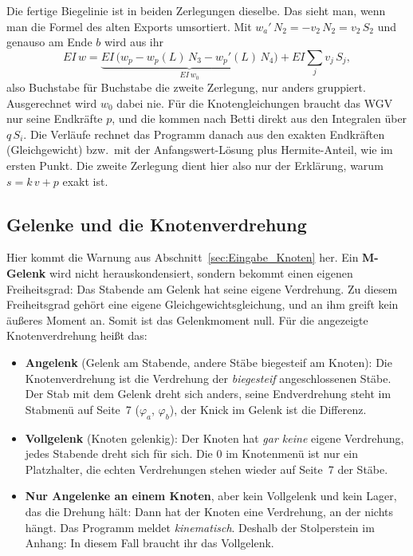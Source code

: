 Die fertige Biegelinie ist in beiden Zerlegungen dieselbe. Das sieht man, wenn man die Formel des
alten Exports umsortiert. Mit $w_a'\,N_2 = -v_2\,N_2 = v_2\,S_2$ und genauso am Ende $b$ wird aus ihr
\[
  EI\,w = \underbrace{EI\,\bigl(w_p - w_p(L)\,N_3 - w_p'(L)\,N_4\bigr)}_{EI\,w_0}
          + EI \sum_j v_j\,S_j ,
\]
also Buchstabe für Buchstabe die zweite Zerlegung, nur anders gruppiert. Ausgerechnet wird $w_0$
dabei nie. Für die Knotengleichungen braucht das WGV nur seine Endkräfte $p$, und die kommen nach
Betti direkt aus den Integralen über $q\,S_i$. Die Verläufe rechnet das Programm danach aus den
exakten Endkräften (Gleichgewicht) bzw.\ mit der Anfangswert-Lösung plus Hermite-Anteil, wie im
ersten Punkt. Die zweite Zerlegung dient hier also nur der Erklärung, warum $s = k\,v + p$ exakt ist.

\subsection{Gelenke und die Knotenverdrehung}\label{sec:mathe-gelenke}

Hier kommt die Warnung aus Abschnitt~\ref{sec:Eingabe_Knoten} her. Ein \textbf{M-Gelenk} wird nicht
herauskondensiert, sondern bekommt einen eigenen Freiheitsgrad: Das Stabende am Gelenk hat seine
eigene Verdrehung. Zu diesem Freiheitsgrad gehört eine eigene Gleichgewichtsgleichung, und an ihm
greift kein äußeres Moment an. Somit ist das Gelenkmoment null. Für die angezeigte Knotenverdrehung
heißt das:

\begin{itemize}
  \item \textbf{Angelenk} (Gelenk am Stabende, andere Stäbe biegesteif am Knoten): Die
        Knotenverdrehung ist die Verdrehung der \emph{biegesteif} angeschlossenen Stäbe. Der Stab
        mit dem Gelenk dreht sich anders, seine Endverdrehung steht im Stabmenü auf Seite~7
        ($\varphi_a$, $\varphi_b$), der Knick im Gelenk ist die Differenz.
  \item \textbf{Vollgelenk} (Knoten gelenkig): Der Knoten hat \emph{gar keine} eigene Verdrehung,
        jedes Stabende dreht sich für sich. Die $0$ im Knotenmenü ist nur ein Platzhalter, die
        echten Verdrehungen stehen wieder auf Seite~7 der Stäbe.
  \item \textbf{Nur Angelenke an einem Knoten}, aber kein Vollgelenk und kein Lager, das die
        Drehung hält: Dann hat der Knoten eine Verdrehung, an der nichts hängt. Das Programm
        meldet \emph{kinematisch}. Deshalb der Stolperstein im Anhang: In diesem Fall braucht ihr
        das Vollgelenk.
\end{itemize}

